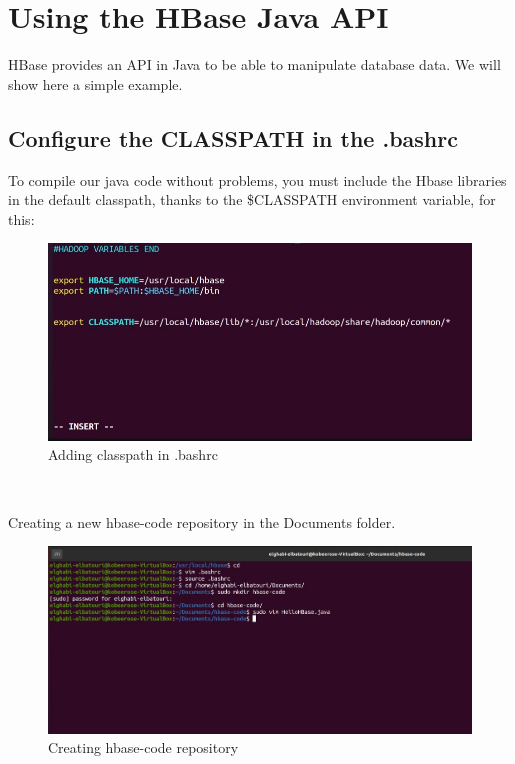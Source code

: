 \chapter{Using the HBase Java API}
\par HBase provides an API in Java to be able to manipulate database data. We will show here a
simple example.
\begin{spacing}{1.2}
\section{Configure the CLASSPATH in the .bashrc }
\par To compile our java code without problems, you must include the Hbase libraries in the default classpath,
thanks to the \$CLASSPATH environment variable, for this:
\\
\begin{figure}[!htb] 
\begin{center} 
\includegraphics[width=1\linewidth]{Pictures/HBase/Using the HBase Java API/Configure the CLASSPATH in the .bashrc/Adding classpath in .bashrc} 
\end{center} 
\caption{Adding classpath in .bashrc} 
\end{figure}  \FloatBarrier
\\
\newpage

\par Creating a new hbase-code repository in the Documents folder.
\\
\begin{figure}[!htb] 
\begin{center} 
\includegraphics[width=1\linewidth]{Pictures/HBase/Using the HBase Java API/Configure the CLASSPATH in the .bashrc/Creating hbase-code repository} 
\end{center} 
\caption{Creating hbase-code repository} 
\end{figure}  \FloatBarrier
\\


\end{spacing}
